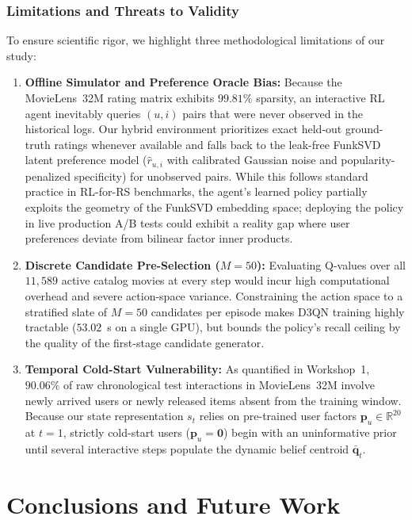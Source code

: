 \subsubsection{Limitations and Threats to Validity}
To ensure scientific rigor, we highlight three methodological limitations of our study:
\begin{enumerate}
    \item \textbf{Offline Simulator and Preference Oracle Bias:} Because the MovieLens~32M rating matrix exhibits $99.81\%$ sparsity, an interactive RL agent inevitably queries $(u, i)$ pairs that were never observed in the historical logs. Our hybrid environment prioritizes exact held-out ground-truth ratings whenever available and falls back to the leak-free FunkSVD latent preference model ($\hat{r}_{u,i}$ with calibrated Gaussian noise and popularity-penalized specificity) for unobserved pairs. While this follows standard practice in RL-for-RS benchmarks, the agent's learned policy partially exploits the geometry of the FunkSVD embedding space; deploying the policy in live production A/B tests could exhibit a reality gap where user preferences deviate from bilinear factor inner products.
    \item \textbf{Discrete Candidate Pre-Selection ($M=50$):} Evaluating Q-values over all $11,589$ active catalog movies at every step would incur high computational overhead and severe action-space variance. Constraining the action space to a stratified slate of $M=50$ candidates per episode makes D3QN training highly tractable ($53.02$~s on a single GPU), but bounds the policy's recall ceiling by the quality of the first-stage candidate generator.
    \item \textbf{Temporal Cold-Start Vulnerability:} As quantified in Workshop~1, $90.06\%$ of raw chronological test interactions in MovieLens~32M involve newly arrived users or newly released items absent from the training window. Because our state representation $s_t$ relies on pre-trained user factors $\mathbf{p}_u \in \mathbb{R}^{20}$ at $t=1$, strictly cold-start users ($\mathbf{p}_u = \mathbf{0}$) begin with an uninformative prior until several interactive steps populate the dynamic belief centroid $\bar{\mathbf{q}}_t$.
\end{enumerate}

\section{Conclusions and Future Work}
\label{sec:conclusions}

